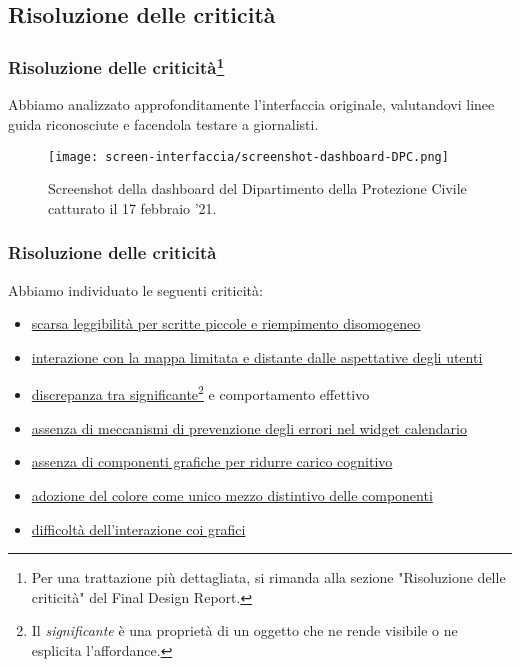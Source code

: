 \subsection{Risoluzione delle criticità}


\begin{frame}
    \frametitle{Risoluzione delle criticità\footnote{Per una trattazione più dettagliata, si rimanda alla sezione "Risoluzione delle criticità" del Final Design Report.}}
    Abbiamo analizzato approfonditamente l'interfaccia originale, valutandovi linee guida riconosciute e facendola testare a giornalisti. 
    \begin{figure}
        \centering
        \texttt{[image: screen-interfaccia/screenshot-dashboard-DPC.png]}
        \caption{Screenshot della dashboard del Dipartimento della Protezione Civile catturato il 17 febbraio '21.}
    \end{figure}
\end{frame}

\begin{frame}
    \frametitle{Risoluzione delle criticità}
    Abbiamo individuato le seguenti criticità: 
    \begin{itemize}
        \item<1-> \hyperlink{f:scarsa-leggibilita}{scarsa leggibilità per scritte piccole e riempimento disomogeneo}        
        \item<2-> \hyperlink{f:mappa}{interazione con la mappa limitata e distante dalle aspettative degli utenti}
        \item<3-> \hyperlink{f:significante}{discrepanza tra significante\footnote{Il \textit{significante} è una proprietà di un oggetto che ne rende visibile o ne esplicita l'affordance.} e comportamento effettivo}
        \item<4-> \hyperlink{f:errori}{assenza di meccanismi di prevenzione degli errori nel widget calendario}
        \item<5-> \hyperlink{f:grafica}{assenza di componenti grafiche per ridurre carico cognitivo}
        \item<6-> \hyperlink{f:colore}{adozione del colore come unico mezzo distintivo delle componenti}
        \item<7-> \hyperlink{f:difficolta}{difficoltà dell'interazione coi grafici}
    \end{itemize}    

\end{frame}

